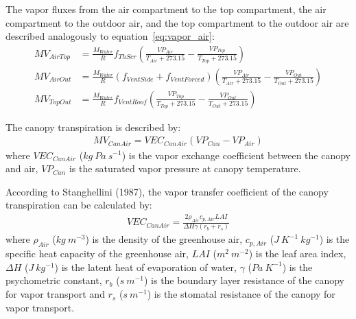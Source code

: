 \documentclass[a4paper]{article}
\numberwithin{equation}{section}
\begin{document}
The vapor fluxes from the air compartment to the top compartment, the air compartment to the outdoor air, and the top compartment to the outdoor air are described analogously to equation~\eqref{eq:vapor_air}:
\begin{align}
  MV_{AirTop} & = \frac{M_{Water}}{R} f_{ThScr} \left(\frac{VP_{Air}}{T_{Air} + 273.15} - \frac{VP_{Top}}{T_{Top} + 273.15}\right)                       \\
  MV_{AirOut} & = \frac{M_{Water}}{R} (f_{VentSide} + f_{VentForced}) \left(\frac{VP_{Air}}{T_{Air} + 273.15} - \frac{VP_{Out}}{T_{Out} + 273.15}\right) \\
  MV_{TopOut} & = \frac{M_{Water}}{R} f_{VentRoof} \left(\frac{VP_{Top}}{T_{Top} + 273.15} - \frac{VP_{Out}}{T_{Out} + 273.15}\right)
\end{align}

The canopy transpiration is described by:
\begin{align}
  MV_{CanAir} = VEC_{CanAir}(VP_{Can} - VP_{Air})
\end{align}
where \(VEC_{CanAir}\) (\(kg\ Pa\ s^{-1}\)) is the vapor exchange coefficient between the canopy and air, \(VP_{Can}\) is the saturated vapor pressure at canopy temperature.

According to Stanghellini (1987), the vapor transfer coefficient of the canopy transpiration can be calculated by:
\begin{align}
  VEC_{CanAir} = \frac{2 \rho_{Air} c_{p,Air}LAI}{\Delta H \gamma (r_b + r_s)}
\end{align}
where \(\rho_{Air}\) (\(kg\ m^{-3}\)) is the density of the greenhouse air, \(c_{p,Air}\) (\(J\ K^{-1}\ kg^{-1}\)) is the specific heat capacity of the greenhouse air, \(LAI\) (\(m^2\ m^{-2}\)) is the leaf area index, \(\Delta H\) (\(J\ kg^{-1}\)) is the latent heat of evaporation of water, \(\gamma\) (\(Pa\ K^{-1}\)) is the psychometric constant, \(r_b\) (\(s\ m^{-1}\)) is the boundary layer resistance of the canopy for vapor transport and \(r_s\) (\(s\ m^{-1}\)) is the stomatal resistance of the canopy for vapor transport.
\end{document}
